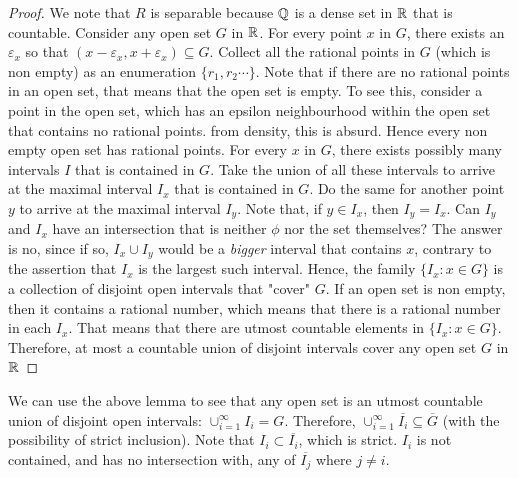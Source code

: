 \documentclass[../Main.tex]{subfiles}
\begin{document}
 \begin{proof}
    We note that $R$ is separable because $\mathbb Q$ is a dense set in $\mathbb R$ that is countable. Consider any open set $G$ in $\mathbb R$. For every point $x$ in $G$, there exists an $\varepsilon_x$ so that $(x-\varepsilon_x,x+\varepsilon_x)\subseteq G$. Collect all the rational points in $G$ (which is non empty) as an enumeration $\{r_1,r_2 \cdots\}$. Note that if there are no rational points in an open set, that means that the open set is empty. To see this, consider a point in the open set, which has an epsilon neighbourhood within the open set that contains no rational points. from density, this is absurd. Hence every non empty open set has rational points. For every $x$ in $G$, there exists possibly many intervals $I$ that is contained in $G$. Take the union of all these intervals to arrive at the maximal interval $I_x$ that is contained in $G$. Do the same for another point $y$ to arrive at the maximal interval $I_y$. Note that, if $y \in I_x$, then $I_y=I_x$. Can $I_y$ and $I_x$ have an intersection that is neither $\phi$ nor the set themselves? The answer is no, since if so, $I_x \cup I_y$ would be a \emph{bigger} interval that contains $x$, contrary to the assertion that $I_x$ is the largest such interval. Hence, the family $\{I_x: x \in G\}$ is a collection of disjoint open intervals that "cover" $G$. If an open set is non empty, then it contains a rational number, which means that there is a rational number in each $I_x$. That means that there are utmost countable elements in $\{I_x: x \in G\}$. Therefore, at most a countable union of disjoint intervals cover any open set $G$ in $\mathbb R$
 \end{proof} 
 We can use the above lemma to see that any open set is an utmost countable union of disjoint open intervals: $\cup_{i=1}^{\infty}I_i=G$. Therefore, $\cup_{i=1}^{\infty}\overline{I_i}\subseteq \overline{G}$ (with the possibility of strict inclusion). Note that $I_i \subset \overline{I_i}$, which is strict. $I_i$ is not contained, and has no intersection with, any of $\overline{I_j}$ where $j \neq i$. 
\end{document}
